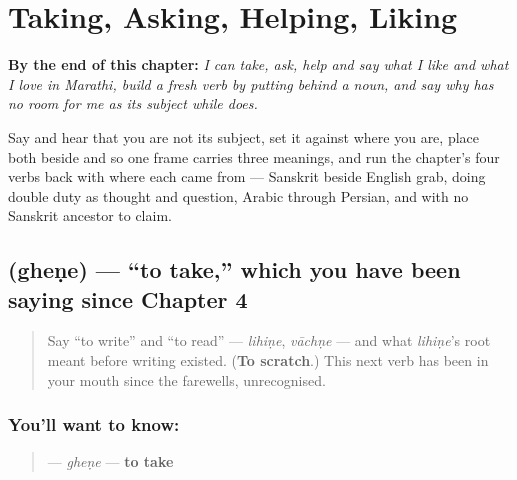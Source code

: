 
\chapter{Taking, Asking, Helping, Liking}
\label{ch:mr-doing-verbs}

\begin{chapteropening}
\textbf{By the end of this chapter:} \emph{I can take, ask, help and say what I like and what I love in Marathi, build a fresh verb by putting  behind a noun, and say why    has no room for me as its subject while    does.}

Say    and hear that you are not its subject, set it against    where you are, place both beside    and    so one frame carries three meanings, and run the chapter's four verbs back with where each came from — Sanskrit  beside English grab,  doing double duty as thought and question, Arabic  through Persian, and  with no Sanskrit ancestor to claim.
\end{chapteropening}

\section[gheṇe]{ (gheṇe) — \textquotedblleft{}to take,\textquotedblright{} which you have been saying since Chapter 4}

\label{lesson:MR-C09-ghene}



\begin{quote}
Say \textquotedblleft{}to write\textquotedblright{} and \textquotedblleft{}to read\textquotedblright{} — \emph{lihiṇe}, \emph{vāchṇe} — and what \emph{lihiṇe}'s root meant before writing existed. (\textbf{To scratch}.) This next verb has been in your mouth since the farewells, unrecognised.
\end{quote}

\subsection*{You'll want to know: }
\begin{quote}
\textbf{} — \emph{gheṇe} — \textbf{to take}
\end{quote}

